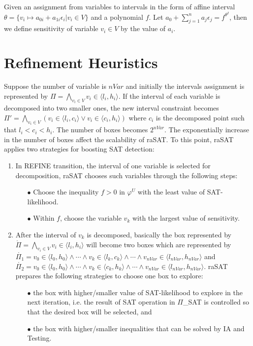 \begin{definition}
Given an assignment from variables to intervals in the form of affine interval $\theta = \{v_i \mapsto a_{0i} + a_{1i}\epsilon_i | v_i \in V\}$ and a polynomial $f$. Let $a_0 + \sum\limits_{j = 1}^n a_j\epsilon_j = f^{\theta^I}$, then we define sensitivity of variable $v_i \in V$ by the value of $a_i$.
\end{definition}

\section{Refinement Heuristics} \label{sec:SATheuristics}
Suppose the number of variable is $nVar$ and initially the intervals assignment is represented by $\Pi = \bigwedge\limits_{v_i \in V} v_i \in \langle l_i, h_i \rangle$. If the interval of each variable is decomposed into two smaller ones, the new interval constraint becomes $\Pi' = \bigwedge\limits_{v_i \in V} (v_i \in \langle l_i, c_i \rangle \vee v_i \in \langle c_i, h_i \rangle)$ where $c_i$ is the decomposed point such that $l_i < c_i < h_i$. The number of boxes becomes $2^{nVar}$. The exponentially increase in the number of boxes affect the scalability of raSAT. To this point, raSAT applies two strategies for boosting SAT detection:
\begin{enumerate}
\item In \tiny{REFINE} \normalsize transition, the interval of one variable is selected for decomposition, raSAT chooses such variables through the following steps:
\begin{itemize}
\item[$\bullet$] Choose the inequality $f > 0$ in $\varphi^U$ with the least value of SAT-likelihood.
\item[$\bullet$] Within $f$, choose the variable $v_k$ with the largest value of sensitivity.
\end{itemize}
\item \sloppy After the interval of $v_k$ is decomposed, basically the box represented by ${\mathring{\Pi} = \bigwedge\limits_{v_i \in V} v_i \in \langle l_i, h_i \rangle}$ will become two boxes which are represented by ${\mathring{\Pi_1} = v_0 \in \langle l_0, h_0 \rangle \wedge \cdots \wedge v_k \in \langle l_k, c_k \rangle \wedge \cdots \wedge v_{nVar} \in \langle l_{nVar}, h_{nVar} \rangle}$ and ${\mathring{\Pi_2} = v_0 \in \langle l_0, h_0 \rangle \wedge \cdots \wedge v_k \in \langle c_k, h_k \rangle \wedge \cdots \wedge v_{nVar} \in \langle l_{nVar}, h_{nVar} \rangle}$. raSAT prepares the following strategies to choose one box to explore:
\begin{itemize}
\item[$\bullet$] the box with higher/smaller value of SAT-likelihood to explore in the next iteration, i.e. the result of SAT operation in \tiny $\Pi$\_SAT \normalsize is controlled so that the desired box will be selected, and
\item[$\bullet$] the box with higher/smaller inequalities that can be solved by IA and Testing.
\end{itemize}

\end{enumerate}
